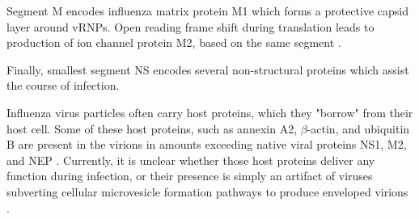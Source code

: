 Segment M encodes influenza matrix protein M1 which forms a protective capsid layer around vRNPs. Open reading frame shift during translation leads to production of ion channel protein M2, based on the same segment \cite{dubois2014influenza}.

Finally, smallest segment NS encodes several non-structural proteins which assist the course of infection.

Influenza virus particles often carry host proteins, which they "borrow" from their host cell. Some of these host proteins, such as annexin A2, $\beta$-actin, and ubiquitin B are present in the virions in amounts exceeding native viral proteins NS1, M2, and NEP \cite{hutchinson2014conserved}. Currently, it is unclear whether those host proteins deliver any function during infection, or their presence is simply an artifact of viruses subverting cellular microvesicle formation pathways to produce enveloped virions \cite{hutchinson2014conserved}.